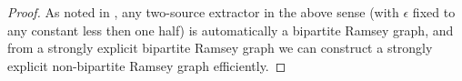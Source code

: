 \documentclass[11pt]{article}
\newtheorem{theorem}{Theorem}
\newtheorem{definition}{Definition}
\newcommand{\todo}[1]{\textcolor{red}{TODO: #1}}
\begin{document}
\begin{proof}
As noted in \cite{BRSW}, any two-source extractor in the above sense (with $\epsilon$ fixed to any constant less then one half) is automatically a bipartite Ramsey graph, and from a strongly explicit bipartite Ramsey graph we can construct a strongly explicit non-bipartite Ramsey graph efficiently.
\end{proof}





\end{document}
